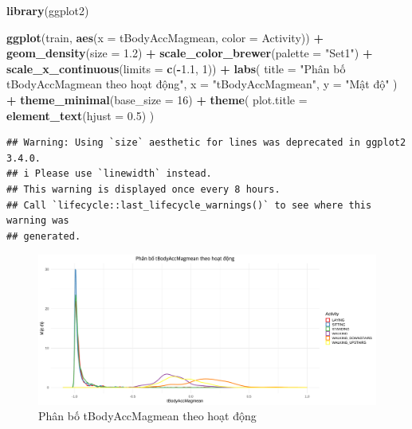 \documentclass[
]{article}
\newenvironment{Shaded}{\begin{snugshade}}{\end{snugshade}}
\newcommand{\AttributeTok}[1]{\textcolor[rgb]{0.13,0.29,0.53}{#1}}
\newcommand{\DecValTok}[1]{\textcolor[rgb]{0.00,0.00,0.81}{#1}}
\newcommand{\FloatTok}[1]{\textcolor[rgb]{0.00,0.00,0.81}{#1}}
\newcommand{\FunctionTok}[1]{\textcolor[rgb]{0.13,0.29,0.53}{\textbf{#1}}}
\newcommand{\NormalTok}[1]{#1}
\newcommand{\SpecialCharTok}[1]{\textcolor[rgb]{0.81,0.36,0.00}{\textbf{#1}}}
\newcommand{\StringTok}[1]{\textcolor[rgb]{0.31,0.60,0.02}{#1}}
\begin{document}
\begin{Shaded}
\begin{Highlighting}[]
\FunctionTok{library}\NormalTok{(ggplot2)}

\FunctionTok{ggplot}\NormalTok{(train, }\FunctionTok{aes}\NormalTok{(}\AttributeTok{x =}\NormalTok{ tBodyAccMagmean, }\AttributeTok{color =}\NormalTok{ Activity)) }\SpecialCharTok{+}
  \FunctionTok{geom\_density}\NormalTok{(}\AttributeTok{size =} \FloatTok{1.2}\NormalTok{) }\SpecialCharTok{+}
  \FunctionTok{scale\_color\_brewer}\NormalTok{(}\AttributeTok{palette =} \StringTok{"Set1"}\NormalTok{) }\SpecialCharTok{+}
  \FunctionTok{scale\_x\_continuous}\NormalTok{(}\AttributeTok{limits =} \FunctionTok{c}\NormalTok{(}\SpecialCharTok{{-}}\FloatTok{1.1}\NormalTok{, }\DecValTok{1}\NormalTok{)) }\SpecialCharTok{+} 
  \FunctionTok{labs}\NormalTok{(}
    \AttributeTok{title =} \StringTok{"Phân bố tBodyAccMagmean theo hoạt động"}\NormalTok{,}
    \AttributeTok{x =} \StringTok{"tBodyAccMagmean"}\NormalTok{,}
    \AttributeTok{y =} \StringTok{"Mật độ"}
\NormalTok{  ) }\SpecialCharTok{+}
  \FunctionTok{theme\_minimal}\NormalTok{(}\AttributeTok{base\_size =} \DecValTok{16}\NormalTok{) }\SpecialCharTok{+}
  \FunctionTok{theme}\NormalTok{(}
    \AttributeTok{plot.title =} \FunctionTok{element\_text}\NormalTok{(}\AttributeTok{hjust =} \FloatTok{0.5}\NormalTok{)}
\NormalTok{  )}
\end{Highlighting}
\end{Shaded}

\begin{verbatim}
## Warning: Using `size` aesthetic for lines was deprecated in ggplot2 3.4.0.
## i Please use `linewidth` instead.
## This warning is displayed once every 8 hours.
## Call `lifecycle::last_lifecycle_warnings()` to see where this warning was
## generated.
\end{verbatim}

\begin{figure}
\centering
\includegraphics{report_files/figure-latex/unnamed-chunk-13-1.pdf}
\caption{Phân bố tBodyAccMagmean theo hoạt động}
\end{figure}
\end{document}
